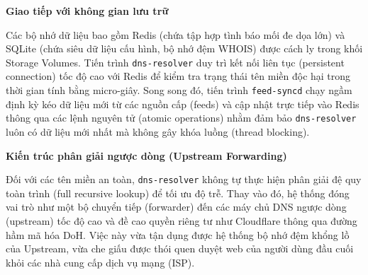 \textbf{Giao tiếp với không gian lưu trữ}

Các bộ nhớ dữ liệu bao gồm Redis (chứa tập hợp tình báo mối đe dọa lớn) và SQLite (chứa siêu dữ liệu cấu hình, bộ nhớ đệm WHOIS) được cách ly trong khối Storage Volumes. Tiến trình \texttt{dns-resolver} duy trì kết nối liên tục (persistent connection) tốc độ cao với Redis để kiểm tra trạng thái tên miền độc hại trong thời gian tính bằng micro-giây. Song song đó, tiến trình \texttt{feed-syncd} chạy ngầm định kỳ kéo dữ liệu mới từ các nguồn cấp (feeds) và cập nhật trực tiếp vào Redis thông qua các lệnh nguyên tử (atomic operations) nhằm đảm bảo \texttt{dns-resolver} luôn có dữ liệu mới nhất mà không gây khóa luồng (thread blocking).

\textbf{Kiến trúc phân giải ngược dòng (Upstream Forwarding)}

Đối với các tên miền an toàn, \texttt{dns-resolver} không tự thực hiện phân giải đệ quy toàn trình (full recursive lookup) để tối ưu độ trễ. Thay vào đó, hệ thống đóng vai trò như một bộ chuyển tiếp (forwarder) đến các máy chủ DNS ngược dòng (upstream) tốc độ cao và đề cao quyền riêng tư như Cloudflare thông qua đường hầm mã hóa DoH. Việc này vừa tận dụng được hệ thống bộ nhớ đệm khổng lồ của Upstream, vừa che giấu được thói quen duyệt web của người dùng đầu cuối khỏi các nhà cung cấp dịch vụ mạng (ISP).
